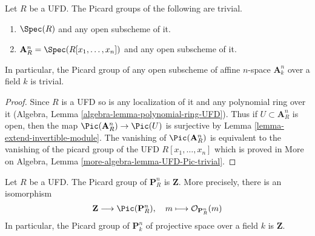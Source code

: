 \begin{lemma}
\label{lemma-open-subscheme-UFD}
Let $R$ be a UFD. The Picard groups of the following are
trivial.
\begin{enumerate}
\item $\Spec(R)$ and any open subscheme of it.
\item $\mathbf{A}^n_R = \Spec(R[x_1, \ldots, x_n])$ and any open subscheme
of it.
\end{enumerate}
In particular, the Picard group of any open subscheme of affine
$n$-space $\mathbf{A}^n_k$ over a field $k$ is trivial.
\end{lemma}

\begin{proof}
Since $R$ is a UFD so is any localization of it and any polynomial
ring over it (Algebra, Lemma \ref{algebra-lemma-polynomial-ring-UFD}).
Thus if $U \subset \mathbf{A}^n_R$ is open, then the map
$\Pic(\mathbf{A}^n_R) \to \Pic(U)$ is surjective
by Lemma \ref{lemma-extend-invertible-module}.
The vanishing of $\Pic(\mathbf{A}^n_R)$ is equivalent to
the vanishing of the picard group of the UFD $R[x_1, \ldots, x_n]$
which is proved in
More on Algebra, Lemma \ref{more-algebra-lemma-UFD-Pic-trivial}.
\end{proof}

\begin{lemma}
\label{lemma-Pic-projective-space-UFD}
Let $R$ be a UFD. The Picard group of $\mathbf{P}^n_R$
is $\mathbf{Z}$. More precisely, there is an isomorphism
$$
\mathbf{Z} \longrightarrow \Pic(\mathbf{P}^n_R),\quad
m \longmapsto \mathcal{O}_{\mathbf{P}^n_R}(m)
$$
In particular, the Picard group of $\mathbf{P}^n_k$ of projective
space over a field $k$ is $\mathbf{Z}$.
\end{lemma}


